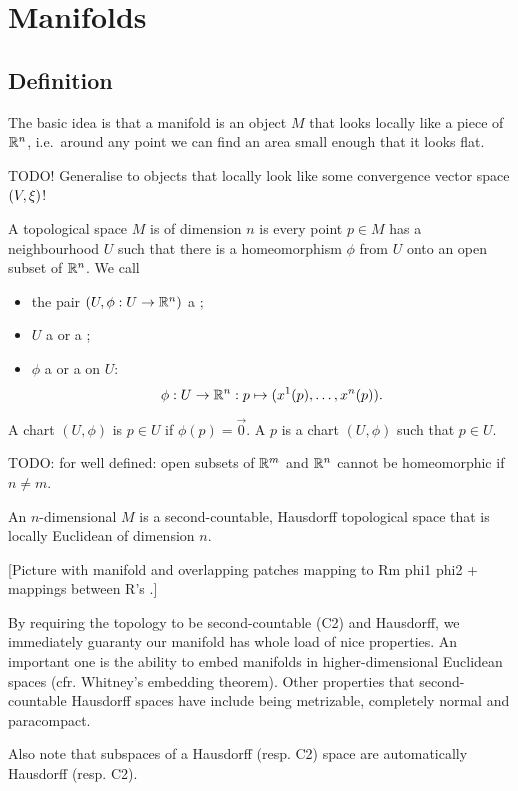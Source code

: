 \chapter{Manifolds}
\section{Definition}
The basic idea is that a manifold is an object $M$ that looks locally like a piece of $\mathbb{R}^n$, i.e.\ around any point we can find an area small enough that it looks flat.

TODO! Generalise to objects that locally look like some convergence vector space $\sSet{V,\xi}$!

\begin{definition}
A topological space $M$ is  of dimension $n$ is every point $p\in M$ has a neighbourhood $U$ such that there is a homeomorphism $\phi$ from $U$ onto an open subset of $\mathbb{R}^n$. We call
\begin{itemize}
\item the pair $(U,\phi:U\to \mathbb{R}^n)$ a ;
\item $U$ a  or a ;
\item $\phi$ a  or a  on $U$:
\[ \phi:U\to \mathbb{R}^n: p\mapsto (x^1(p), \ldots, x^n(p)). \]
\end{itemize}
A chart $(U,\phi)$ is  $p\in U$ if $\phi(p) = \vec{0}$. A  $p$ is a chart $(U,\phi)$ such that $p\in U$.
\end{definition}
TODO: for well defined: open subsets of $\mathbb{R}^m$ and $\mathbb{R}^n$ cannot be homeomorphic if $n\neq m$.
\begin{definition}
An $n$-dimensional  $M$ is a second-countable, Hausdorff topological space that is locally Euclidean of dimension $n$.
\end{definition}
[Picture with manifold and overlapping patches mapping to Rm phi1 phi2 + mappings between R's .]

By requiring the topology to be second-countable (C2) and Hausdorff, we immediately guaranty our manifold has whole load of nice properties. An important one is the ability to embed manifolds in higher-dimensional Euclidean spaces (cfr. Whitney's embedding theorem). Other properties that second-countable Hausdorff spaces have include being metrizable, completely normal and paracompact.

Also note that subspaces of a Hausdorff (resp. C2) space are automatically Hausdorff (resp. C2).

